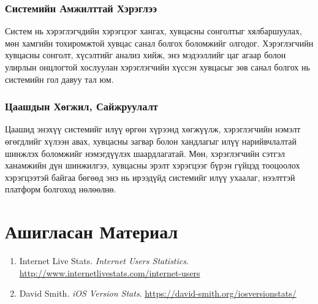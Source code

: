 \subsection{Системийн Амжилттай Хэрэглээ}
Систем нь хэрэглэгчдийн хэрэгцээг хангах, хувцасны сонголтыг хялбаршуулах, мөн хамгийн тохиромжтой хувцас санал болгох боломжийг олгодог. Хэрэглэгчийн хувцасны сонголт, хүсэлтийг анализ хийж, энэ мэдээллийг цаг агаар болон улирлын онцлогтой хослуулан хэрэглэгчийн хүссэн хувцасыг зөв санал болгох нь системийн гол давуу тал юм.

\subsection{Цаашдын Хөгжил, Сайжруулалт}
Цаашид энэхүү системийг илүү өргөн хүрээнд хөгжүүлж, хэрэглэгчийн нэмэлт өгөгдлийг хүлээн авах, хувцасны загвар болон хандлагыг илүү нарийвчлалтай шинжлэх боломжийг нэмэгдүүлэх шаардлагатай. Мөн, хэрэглэгчийн сэтгэл ханамжийн дүн шинжилгээ, хувцасны эрэлт хэрэгцээг бүрэн гүйцэд тооцоолох хэрэгцээтэй байгаа бөгөөд энэ нь ирээдүйд системийг илүү ухаалаг, нээлттэй платформ болгоход нөлөөлнө.

\chapter*{Ашигласан Материал}
\begin{enumerate}
    \item Internet Live Stats. \textit{Internet Users Statistics}. \url{http://www.internetlivestats.com/internet-users}
    \item David Smith. \textit{iOS Version Stats}. \url{https://david-smith.org/iosversionstats/}
\end{enumerate}
